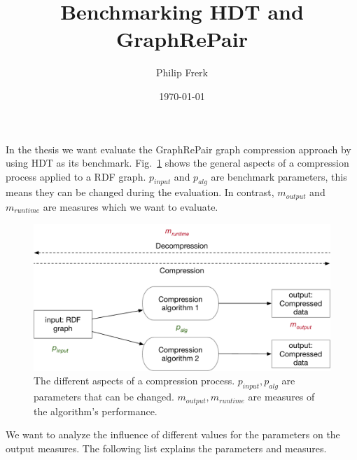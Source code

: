 \documentclass[a4paper]{scrartcl}
\title{Benchmarking HDT and GraphRePair}
\author{Philip Frerk}
\date{\today}
\begin{document}
\maketitle

In the thesis we want evaluate the GraphRePair graph compression approach by using HDT as its benchmark. Fig.~\ref{fig:benchmark} shows the general aspects of a compression process applied to a RDF graph. $p_{input}$ and $p_{alg}$ are benchmark parameters, this means they can be changed during the evaluation. In contrast, $m_{output}$ and $m_{runtime}$ are measures which we want to evaluate.

\begin{figure}[h]
	\centering
	\includegraphics[width=1\textwidth]{Benchmark_fig}
	\caption{The different aspects of a compression process. $p_{input},p_{alg}$ are parameters that can be changed. $m_{output},m_{runtime}$ are measures of the algorithm's performance.}
	\label{fig:benchmark}
\end{figure}

We want to analyze the influence of different values for the parameters on the output measures. The following list explains the parameters and measures.
\end{document}
